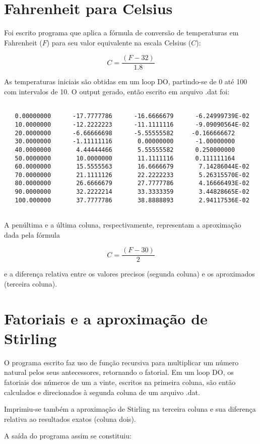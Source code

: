 \documentclass{article}
\begin{document}
\section{Fahrenheit para Celsius}
Foi escrito programa que aplica a fórmula de conversão de temperaturas em Fahrenheit ($F$) para seu valor equivalente na escala Celsius ($C$):

\[C = \frac{(F-32)}{1.8}\]

As temperaturas iniciais são obtidas em um loop DO, partindo-se de 0 até 100 com intervalos de 10. O output gerado, então escrito em arquivo .dat foi:

\begin{lstlisting}

   0.00000000      -17.7777786      -16.6666679      -6.24999739E-02
   10.0000000      -12.2222223      -11.1111116      -9.09090564E-02
   20.0000000      -6.66666698      -5.55555582     -0.166666672    
   30.0000000      -1.11111116       0.00000000      -1.00000000    
   40.0000000       4.44444466       5.55555582      0.250000000    
   50.0000000       10.0000000       11.1111116      0.111111164    
   60.0000000       15.5555563       16.6666679       7.14286044E-02
   70.0000000       21.1111126       22.2222233       5.26315570E-02
   80.0000000       26.6666679       27.7777786       4.16666493E-02
   90.0000000       32.2222214       33.3333359       3.44828665E-02
   100.000000       37.7777786       38.8888893       2.94117536E-02


\end{lstlisting}
 
A penúltima e a última coluna, respectivamente, representam a aproximação dada pela fórmula

\[C = \frac{(F-30)}{2}\]

e a diferença relativa entre os valores precisos (segunda coluna) e os aproximados (terceira coluna).

\section{Fatoriais e a aproximação de Stirling}

O programa escrito faz uso de função recursiva para multiplicar um número natural pelos seus antecessores, retornando o fatorial. Em um loop DO, os fatoriais dos números de um a vinte, escritos na primeira coluna, são então calculados e direcionados à segunda coluna de um arquivo .dat. \par
Imprimiu-se também a aproximação de Stirling na terceira coluna e sua diferença relativa ao resultados exatos (coluna dois). \par
A saída do programa assim se constituiu:
\end{document}

